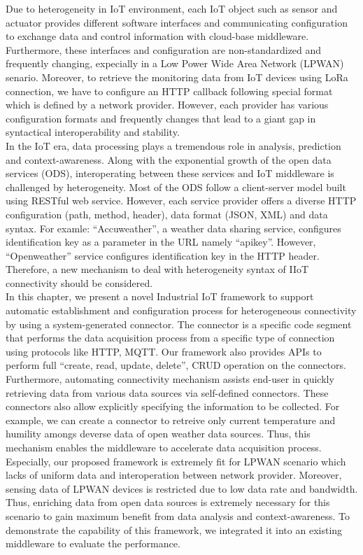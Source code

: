 Due to heterogeneity in IoT environment, each IoT object such as sensor and actuator provides different software interfaces and communicating configuration to exchange data and control information with cloud-base middleware. Furthermore, these interfaces and configuration are non-standardized and frequently changing, expecially in a Low Power Wide Area Network (LPWAN) senario. Moreover, to retrieve the monitoring data from IoT devices using LoRa  connection, we have to configure an HTTP callback following special format which is defined by a network provider. However, each provider has various configuration formats and frequently changes that lead to a giant gap in syntactical interoperability and stability.\\

In the IoT era, data processing plays a tremendous role in analysis, prediction and context-awareness. Along with the exponential growth of the open data services (ODS), interoperating between these services and IoT middleware is challenged by heterogeneity. Most of the ODS follow a client-server model built using RESTful web service. However, each service provider offers a diverse HTTP configuration (path, method, header), data format (JSON, XML) and data syntax. For examle: ``Accuweather'', a weather data sharing service, configures identification key as a parameter in the URL namely ``apikey''. However, ``Openweather'' service configures identification key in the HTTP header. Therefore, a new mechanism to deal with heterogeneity syntax of IIoT connectivity should be considered.\\

In this chapter, we present a novel Industrial IoT framework to support automatic establishment and configuration process for heterogeneous connectivity by using a system-generated connector. The connector is a specific code segment that performs the data acquisition process from a specific type of connection using protocols like HTTP, MQTT. Our framework also provides APIs to perform full ``create, read, update, delete'', CRUD operation on the connectors. Furthermore, automating connectivity mechanism assists end-user in quickly retrieving data from various data sources via self-defined connectors. These connectors also allow explicitly specifying the information to be collected. For example, we can create a connector to retreive only current temperature and humility amongs deverse data of open weather data sources. Thus, this mechanism enables the middleware to accelerate data acquisition process. Especially, our proposed framework is extremely fit for LPWAN scenario which lacks of uniform data and interoperation between network provider. Moreover, sensing data of LPWAN devices is restricted due to low data rate and bandwidth. Thus, enriching data from open data sources is extremely necessary for this scenario to gain maximum benefit from data analysis and context-awareness. To demonstrate the capability of this framework, we integrated it into an existing middleware to evaluate the performance. \\

